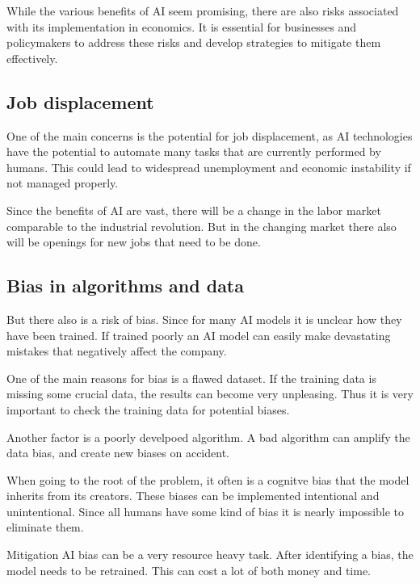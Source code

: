 While the various benefits of AI seem promising, there are also risks associated with its implementation in economics.
It is essential for businesses and policymakers to address these risks and develop strategies to mitigate them effectively.

\cite{AiEconomics}

\subsection{Job displacement}
\label{subsec:job-displacement}

One of the main concerns is the potential for job displacement, as AI technologies have the potential to automate many tasks that are currently performed by humans. This could lead to widespread unemployment and economic instability if not managed properly. 

Since the benefits of AI are vast, there will be a change in the labor market comparable to the industrial revolution.  
But in the changing market there also will be openings for new jobs that need to be done. 

\cite{AiAndJobs} 

\subsection{Bias in algorithms and data}
\label{subsec:bias-in-algorithms-and-data}

But there also is a risk of bias. Since for many AI models it is unclear how they have been trained. 
If trained poorly an AI model can easily make devastating mistakes that negatively affect the company.

One of the main reasons for bias is a flawed dataset. If the training data is missing some crucial data, the results can become very unpleasing. 
Thus it is very important to check the training data for potential biases.

Another factor is a poorly develpoed algorithm. A bad algorithm can amplify the data bias, and create new biases on accident. 

When going to the root of the problem, it often is a cognitve bias that the model inherits from its creators. 
These biases can be implemented intentional and unintentional. Since all humans have some kind of bias it is nearly impossible to eliminate them. 

Mitigation AI bias can be a very resource heavy task. After identifying a bias, the model needs to be retrained. This can cost a lot of both money and time. 

